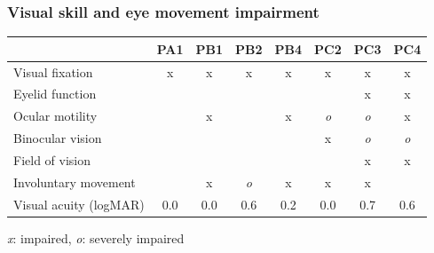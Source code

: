 \documentclass{kul-ulille-beamer}
\begin{document}
\begin{frame}[noframenumbering]
  \frametitle{Visual skill and eye movement impairment}
  \newcommand{\skill}{}
  \newcommand{\noskill}{x}
  \newcommand{\snoskill}{\emph{o}}

  \begin{tabular}{l|ccccccc}
                            & PA1      & PB1      & PB2       & PB4      & PC2       & PC3       & PC4 \\ \hline
    \small Visual fixation         & \noskill & \noskill & \noskill  & \noskill & \noskill  & \noskill  & \noskill \\
    \small Eyelid function         & \skill   & \skill   & \skill    & \skill   &  \skill  & \noskill  & \noskill \\
    \small Ocular motility         & \skill   & \noskill & \skill    & \noskill & \snoskill & \snoskill & \noskill\\
    \small Binocular vision        & \skill   & \skill   & \skill    & \skill   & \noskill  & \snoskill & \snoskill \\
    \small Field of vision         & \skill   & \skill   & \skill    & \skill   & \skill    & \noskill  & \noskill \\
    \small Involuntary movement    & \skill   & \noskill & \snoskill  &
    \noskill &  \noskill  & \noskill  & \skill \\ \hline
  Visual acuity (logMAR)  & 0.0      & 0.0      & 0.6       & 0.2      & 0.0       & 0.7  & 0.6\\
  \end{tabular}
  \bigskip

  \emph{x}: impaired, \emph{o}: severely impaired
\end{frame}
\end{document}
